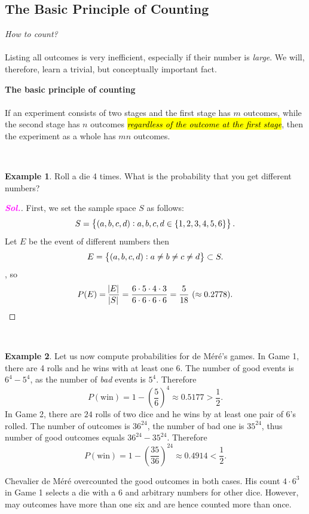 \documentclass[12pt,a4paper]{article}
\theoremstyle{definition}
\newtheorem{example}{Example}[section]
\theoremstyle{definition}
\theoremstyle{definition}
\theoremstyle{definition}
\theoremstyle{remark}
\theoremstyle{definition}
\newcommand{\sol}{\textcolor{magenta}{\bf \textit{Sol.}}\quad}
\begin{document}
\subsection{The Basic Principle of Counting}
\textit{How to count?}\\
\\
Listing all outcomes is very inefficient, especially if their number is \textit{large}. We will, therefore, learn a trivial, but conceptually important fact.
\\
\begin{tcolorbox}[colback=white]
	\textbf{The basic principle of counting}\\
	\\
	If an experiment consists of two stages and the first stage	has $m$ outcomes, while the second stage has $n$ outcomes \hl{\textit{regardless of the outcome at the first stage}}, then the
	experiment as a whole has $mn$ outcomes.
\end{tcolorbox}
\
\begin{example}
	Roll a die 4 times. What is the probability that you get different numbers?\begin{proof}[\sol]
		First, we set the sample space $S$ as follows: \[
		S=\set{(a,b,c,d):a,b,c,d\in\set{1,2,3,4,5,6}}.
		\]Let $E$ be the event of different numbers then \[
		E=\set{(a,b,c,d):a\neq b\neq c\neq d}\subset S.
		\], so \[
		P(E)=\frac{\abs{E}}{\abs{S}}=\frac{6\cdot5\cdot4\cdot3}{6\cdot6\cdot6\cdot6}=\frac{5}{18}\ (\approx0.2778).
		\]
	\end{proof}
\end{example}
\
\begin{example}
	Let us now compute probabilities for de M\'{e}r\'{e}'s games. In Game 1, there are 4 rolls and he wins with at least one $6$. The number of good events is $6^4-5^4$, as the number of \textit{bad} events is $5^4$. Therefore \[
	P(\text{win})=1-\left(\frac{5}{6}\right)^4\approx0.5177>\frac{1}{2}.
	\] In Game 2, there are $24$ rolls of two dice and he wins by at least one pair of $6$'s rolled. The number of outcomes is $36^{24}$, the number of bad one is $35^{24}$, thus number of good outcomes equals $36^{24}-35^{24}$. Therefore \[
	P(\text{win})=1-\left(\frac{35}{36}\right)^{24}\approx0.4914<\frac{1}{2}.
	\]\par Chevalier de M\'{e}r\'{e} overcounted the good outcomes in both cases. His count $4\cdot 6^3$ in Game 1 selects a die with a $6$ and arbitrary numbers for other dice. However, may outcomes have more than one six and are hence counted more than once.
\end{example}
\end{document}
